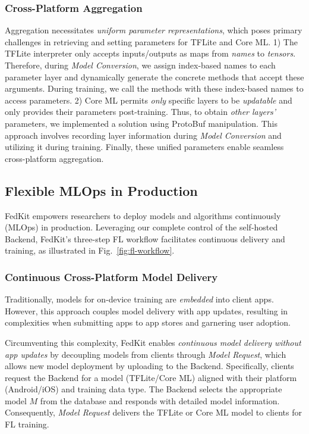 \documentclass[letterpaper]{article} %
\begin{document}
\subsubsection{Cross-Platform Aggregation}
Aggregation necessitates
\textit{uniform parameter representations},
which poses primary challenges in
retrieving and setting parameters for TFLite and Core ML.
1)
The TFLite interpreter only accepts inputs/outputs as maps from \textit{names} to
\textit{tensors}.
Therefore, during \textit{Model Conversion},
we assign index-based names to each parameter layer and
dynamically generate the concrete methods that accept these arguments.
During training, we call the methods with these index-based names to
access parameters.
2)
Core ML permits \textit{only} specific layers to be \textit{updatable} and
only provides their parameters post-training.
Thus, to obtain \textit{other layers'} parameters,
we implemented a solution using ProtoBuf manipulation.
This approach involves recording layer information
during \textit{Model Conversion} and
utilizing it during training.
Finally, these unified parameters enable seamless cross-platform aggregation.

\subsection{Flexible MLOps in Production}
\newcommand{\model}{$M$}
\newcommand{\fs}{$S_\mathrm F$}
FedKit empowers researchers to deploy models and algorithms continuously (MLOps)
in production.
Leveraging our complete control of the self-hosted Backend,
FedKit's three-step FL workflow
facilitates continuous delivery and training,
as illustrated in Fig.~\ref{fig:fl-workflow}.
\subsubsection{Continuous Cross-Platform Model Delivery}
Traditionally, models for on-device training are \textit{embedded} into client apps.
However, this approach couples model delivery with app updates, 
resulting in complexities when submitting apps to app stores and garnering user adoption.

Circumventing this complexity,
FedKit enables \textit{continuous model delivery without app updates} by
decoupling models from clients through \textit{Model Request},
which allows new model deployment by uploading to the Backend.
Specifically, clients request the Backend for a model (TFLite/Core ML)
aligned with
their platform (Android/iOS) and training data type.
The Backend selects the appropriate model \model{} from the database and
responds with detailed model information.
Consequently, \textit{Model Request} delivers the TFLite or Core ML model
to clients for FL training.
\end{document}
